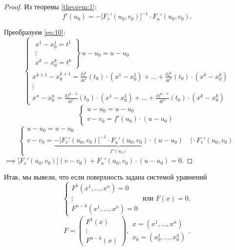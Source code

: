 \begin{proof}
    Из теоремы \ref{theorem:1}:
    \[
        f'(u_0) = -\big[F_v'(u_0,v_0)\big]^{-1} \cdot F_u'(u_0,v_0).
    \]

    Преобразуем \ref{eq:10}:
    \[
        \left\{\begin{array}{l}
            \left.\begin{array}{l}
                      x^1 - x_0^1 = t^1 \\
                      \vdots            \\
                      x^k - x_0^k = t^k
                  \end{array}\right\} \ u - u_0 = u - u_0                                                                                                \\
            x^{k+1} - x_0^{k+1} = \frac{\delta f^1}{\delta t^1}(t_0)\cdot (x^1 - x_0^1) + \ldots + \frac{\delta f^1}{\delta t^k}(t_0)\cdot (x^k - x_0^k) \\
            \vdots                                                                                                                                       \\
            x^n - x_0^n = \frac{\delta f^{n-k}}{\delta t^1}(t_0)\cdot (x^1 - x_0^1) + \ldots + \frac{\delta f^{n-k}}{\delta t^k}(t_0)\cdot (x^k - x_0^k)
        \end{array}\right.
    \]
    \[
        \left\{\begin{array}{l}
            u-u_0 = u-u_0 \\
            v-v_0 = f'(u_0) \cdot (u-u_0)
        \end{array}\right.
    \]
    \[
        \left\{\begin{array}{l}
            u-u_0 = u-u_0 \\
            v - v_0 = \underbrace{-\big[F_v'(u_0,v_0)\big]^{-1}\cdot F_u'(u_0,v_0)\cdot (u-u_0)}_{f'(u_0)} \quad \Big| \cdot F_v'(u_0,v_0)
        \end{array}\right.
    \]
    $ \implies \big[F_v'(u_0,v_0)\big](v-v_0) + F_u'(u_0,v_0)\cdot(u-u_0) = 0 $.
\end{proof}

Итак, мы вывели, что если поверхность задана системой уравнений
\[
    \left\{\begin{array}{l}
        F^1(x^1,\ldots,x^n) = 0 \\
        \vdots                  \\
        F^{n-k}(x^1,\ldots,x^n) = 0
    \end{array}\right.\text{ или }F(x) = 0,
\]
\[
    F = \left(\begin{matrix}
            F^1(x) \\
            \vdots \\
            F^{n-k}(x)
        \end{matrix}\right), \begin{array}{l}
        x = (x^1,\ldots,x^n) \\
        x_0 = (x_0^1,\ldots,x_0^n)
    \end{array}.
\]

